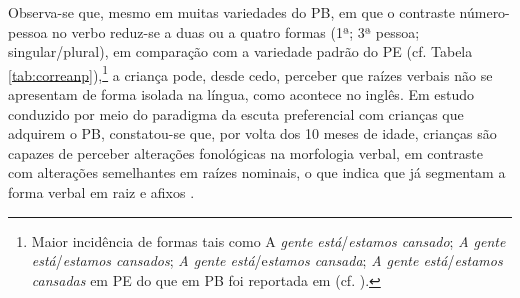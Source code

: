 \documentclass[output=paper]{LSP/langsci}
\begin{document}
Observa-se que, mesmo em muitas variedades do PB, em que o contraste número-pessoa no verbo reduz-se a duas ou a quatro formas (1ª; 3ª pessoa; singular/plural), em comparação com a variedade padrão do PE (cf. Tabela \ref{tab:correanp}),\footnote{Maior incidência de formas tais como A\textit{ gente está}/\textit{estamos cansado}; \textit{A gente está}/\textit{estamos cansados}; \textit{A gente está}/e\textit{stamos cansada}; \textit{A gente está}/\textit{estamos cansadas} em PE do que em PB foi reportada em \citet{martoculio_etal2013} (cf. \citealt{vieirabrandao2014}).
} a criança pode, desde cedo, perceber que raízes verbais não se apresentam de forma isolada na língua, como acontece no inglês. Em estudo conduzido por meio do paradigma da escuta preferencial com crianças que adquirem o PB, constatou-se que, por volta dos 10 meses de idade, crianças são capazes de perceber alterações fonológicas na morfologia verbal, em contraste com alterações semelhantes em raízes nominais, o que indica que já segmentam a forma verbal em raiz e afixos \citep{bagetticorrea2011}.
\end{document}
